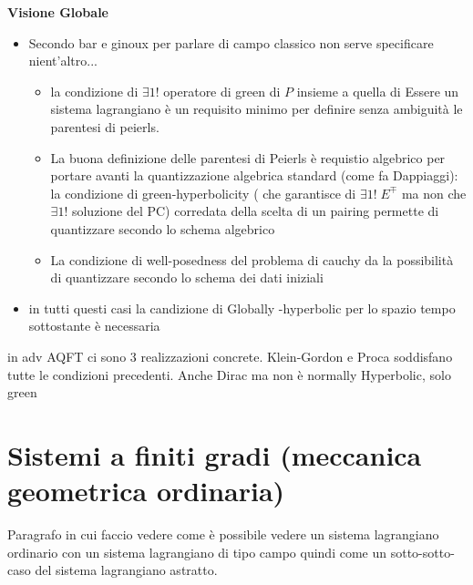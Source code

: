 \documentclass[Main]{subfiles}
\begin{document}
		\begin{observation}
			\begin{center}
				\textbf{Visione Globale}
			\end{center}
			\begin{itemize}
			\item Secondo bar e ginoux per parlare di campo classico non serve specificare nient'altro...
				\begin{itemize}
					\item la condizione di $\exists  1!$ operatore di green di $P$  insieme a quella di Essere un sistema lagrangiano è un requisito minimo  per definire senza ambiguità le parentesi di peierls.
					\item La buona definizione delle parentesi di Peierls è requistio algebrico per portare avanti la quantizzazione algebrica standard (come fa Dappiaggi): \\
					la condizione di green-hyperbolicity ( che garantisce di $\exists 1!\; E^\mp$ ma non che  $\exists 1!$ soluzione del PC) corredata della scelta di un pairing permette di quantizzare secondo lo schema algebrico
					\item La condizione di well-posedness del problema di cauchy da la possibilità di quantizzare secondo lo schema dei dati iniziali
				\end{itemize}
				\item in tutti questi casi la candizione di Globally -hyperbolic per lo spazio tempo sottostante è necessaria
			\end{itemize}
		\end{observation}
		
		\begin{example}
			in adv AQFT ci sono 3 realizzazioni concrete. Klein-Gordon e Proca soddisfano tutte le condizioni precedenti. Anche Dirac ma non è normally Hyperbolic, solo green
		\end{example}

	\section{Sistemi a finiti gradi (meccanica geometrica ordinaria)}
		Paragrafo in cui faccio vedere come è possibile vedere un sistema lagrangiano ordinario con un sistema lagrangiano di tipo campo quindi come un sotto-sotto-caso del sistema lagrangiano astratto.
\end{document}
